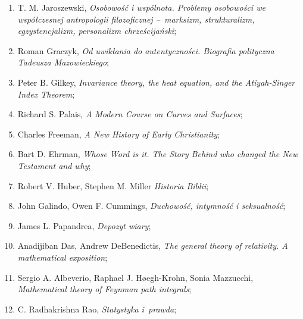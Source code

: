 \documentclass[a4paper,11pt]{article}
\begin{document}
\begin{enumerate}
\item T. M. Jaroszewski, \textit{Osobowość i wspólnota. Problemy
    osobowości we współczesnej antropologii filozoficznej --~marksizm,
    strukturalizm, egzystencjalizm, personalizm chrześcijański};



\item Roman Graczyk, \textit{Od uwikłania do autentyczności. Biografia
    polityczna Tadeusza Mazowieckiego};



\item Peter B. Gilkey, \textit{Invariance theory, the heat equation, and
    the Atiyah-Singer Index Theorem};



\item Richard S. Palais, \textit{A Modern Course on Curves and
    Surfaces};



\item Charles Freeman, \textit{A New History of Early Christianity};



\item Bart D. Ehrman, \textit{Whose Word is it. The Story Behind who
    changed the New Testament and why};



\item Robert V. Huber, Stephen M. Miller \textit{Historia Biblii};



\item John Galindo, Owen F. Cummings, \textit{Duchowość, intymność i
    seksualność};



\item James L. Papandrea, \textit{Depozyt wiary};



\item Anadijiban Das, Andrew DeBenedictis, \textit{The general theory of
    relativity. A mathematical exposition};



\item Sergio A. Albeverio, Raphael J. H\o egh-Krohn, Sonia Mazzucchi,
  \textit{Mathematical theory of Feynman path integrals};



\item C. Radhakrishna Rao, \textit{Statystyka i~prawda};




\end{enumerate}
\end{document}
